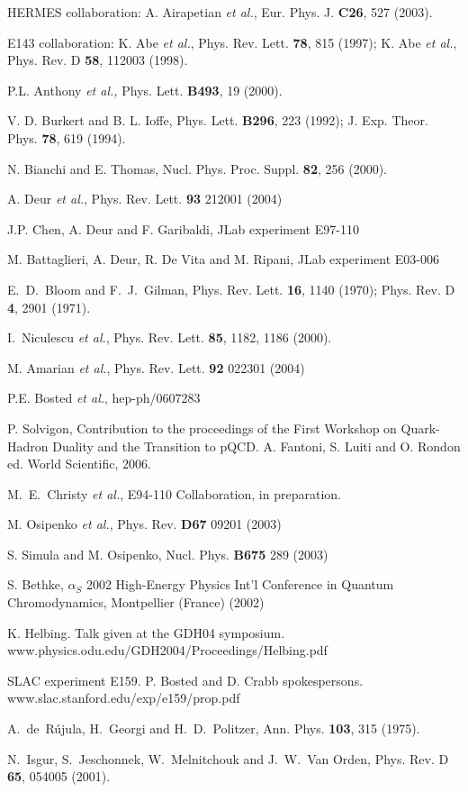 HERMES collaboration: A. Airapetian \emph{et al.}, 
Eur. Phys. J. {\bf C26}, 527 (2003).

E143 collaboration: K. Abe \emph{et al.},
Phys. Rev. Lett. \textbf{78}, 815 (1997); 
K. Abe \emph{et al.}, 
Phys. Rev. D {\bf58}, 112003 (1998).

P.L. Anthony {\it et al.,} Phys. Lett. {\bf B493}, 19 (2000).

V. D. Burkert and B. L. Ioffe,
Phys. Lett. \textbf{B296}, 223 (1992);
J. Exp. Theor. Phys. {\bf 78}, 619 (1994).

 N. Bianchi and E. Thomas,
Nucl. Phys. Proc. Suppl. \textbf{82}, 256 (2000).

A. Deur {\em et al.}, Phys. Rev. Lett. {\bf 93} 212001 (2004)

 J.P. Chen, A. Deur and F. Garibaldi, JLab experiment
E97-110

 M. Battaglieri, A. Deur, R. De Vita and M. Ripani,
JLab experiment E03-006

E.~D.~Bloom and F.~J.~Gilman,
Phys. Rev. Lett. {\bf 16}, 1140 (1970);
Phys. Rev. D {\bf 4}, 2901 (1971).

I.~Niculescu {\em et al.},
Phys. Rev. Lett. {\bf 85}, 1182, 1186 (2000).

 M. Amarian {\em et al.}, 
Phys. Rev. Lett. {\bf 92} 022301 (2004)


P.E. Bosted {\it et al.},
hep-ph/0607283


 P. Solvigon, Contribution to the proceedings of the First 
Workshop on Quark-Hadron Duality and the Transition to pQCD. A. Fantoni, 
S. Luiti and O. Rondon ed. World Scientific, 2006.


M.~E.~Christy {\em et al.},
E94-110 Collaboration, in preparation.

M. Osipenko {\em et al.}, Phys. Rev. {\bf D67} 09201 (2003)

S. Simula and M. Osipenko, Nucl. Phys. {\bf B675} 289 (2003)

 S. Bethke, $\alpha_S$ 2002 High-Energy Physics Int'l 
Conference in Quantum Chromodynamics, Montpellier (France) (2002)

 K. Helbing. Talk given at the GDH04 symposium. 
www.physics.odu.edu/GDH2004/Proceedings/Helbing.pdf

 SLAC experiment E159. P. Bosted and D. Crabb spokespersons.
www.slac.stanford.edu/exp/e159/prop.pdf

 
A.~de~R\'ujula, H.~Georgi and H.~D.~Politzer,
Ann. Phys. {\bf 103}, 315 (1975).

N.~Isgur, S.~Jeschonnek, W.~Melnitchouk and J.~W.~Van Orden,
Phys. Rev. D {\bf 65}, 054005 (2001).

